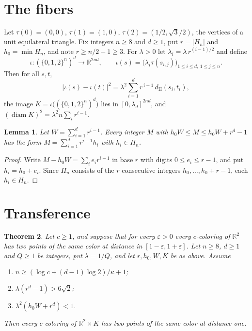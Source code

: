 \documentclass[11pt]{amsart}
\newtheorem{theorem}{Theorem}
\newtheorem{lemma}[theorem]{Lemma}
\theoremstyle{definition}
\theoremstyle{remark}
\newcommand{\R}{\mathbb{R}}
\newcommand{\dH}{d_{\mathrm H}}
\begin{document}
\section{The fibers}

Let $\tau(0)=(0,0)$, $\tau(1)=(1,0)$, $\tau(2)=(1/2,\sqrt3/2)$, the vertices of a unit
equilateral triangle. Fix integers $n\ge8$ and $d\ge1$, put $r=|H_n|$ and $h_0=\min H_n$, and
note $r\ge n/2-1\ge3$. For $\lambda>0$ let $\lambda_i=\lambda\,r^{(i-1)/2}$ and define
\[
  \iota:(\{0,1,2\}^n)^d\to\R^{2nd},\qquad
  \iota(s)=\bigl(\lambda_i\tau(s_{i,j})\bigr)_{1\le i\le d,\ 1\le j\le n}.
\]
Then for all $s,t$,
\begin{equation}\label{eq:iso}
  |\iota(s)-\iota(t)|^2=\lambda^2\sum_{i=1}^d r^{\,i-1}\,\dH(s_i,t_i),
\end{equation}
the image $K=\iota\bigl((\{0,1,2\}^n)^d\bigr)$ lies in $[0,\lambda_d]^{2nd}$, and
$(\operatorname{diam}K)^2=\lambda^2 n\sum_i r^{i-1}$.

\begin{lemma}\label{lem:window}
Let $W=\sum_{i=1}^d r^{i-1}$. Every integer $M$ with $h_0W\le M\le h_0W+r^d-1$ has the form
$M=\sum_{i=1}^d r^{i-1}h_i$ with $h_i\in H_n$.
\end{lemma}

\begin{proof}
Write $M-h_0W=\sum_i e_ir^{i-1}$ in base $r$ with digits $0\le e_i\le r-1$, and put
$h_i=h_0+e_i$. Since $H_n$ consists of the $r$ consecutive integers $h_0,\dots,h_0+r-1$, each
$h_i\in H_n$.
\end{proof}

\section{Transference}

\begin{theorem}\label{thm:transfer}
Let $c\ge1$, and suppose that for every $\varepsilon>0$ every $c$-coloring of $\R^2$ has two
points of the same color at distance in $[1-\varepsilon,1+\varepsilon]$. Let $n\ge8$, $d\ge1$
and $Q\ge1$ be integers, put $\lambda=1/Q$, and let $r,h_0,W,K$ be as above. Assume
\begin{enumerate}[label=\textup{(\roman*)}]
\item $n\ge(\log c+(d-1)\log2)/\kappa+1$;
\item $\lambda(r^d-1)>6\sqrt2$;
\item $\lambda^2(h_0W+r^d)<1$.
\end{enumerate}
Then every $c$-coloring of $\R^2\times K$ has two points of the same color at distance one.
\end{theorem}
\end{document}
